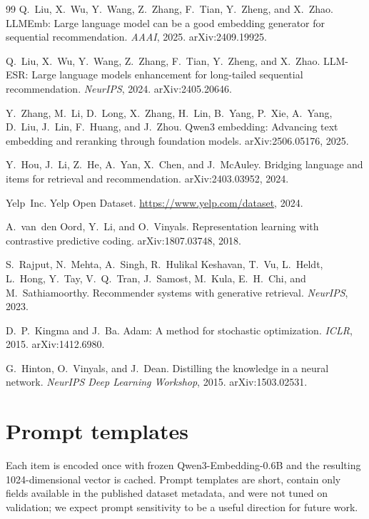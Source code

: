 \documentclass{article}
\begin{document}
{\begin{thebibliography}{99}
Q.~Liu, X.~Wu, Y.~Wang, Z.~Zhang, F.~Tian, Y.~Zheng, and X.~Zhao.
LLMEmb: Large language model can be a good embedding generator for
sequential recommendation.
\emph{AAAI}, 2025. arXiv:2409.19925.

Q.~Liu, X.~Wu, Y.~Wang, Z.~Zhang, F.~Tian, Y.~Zheng, and X.~Zhao.
LLM-ESR: Large language models enhancement for long-tailed sequential
recommendation.
\emph{NeurIPS}, 2024. arXiv:2405.20646.

Y.~Zhang, M.~Li, D.~Long, X.~Zhang, H.~Lin, B.~Yang, P.~Xie, A.~Yang,
D.~Liu, J.~Lin, F.~Huang, and J.~Zhou.
Qwen3 embedding: Advancing text embedding and reranking through
foundation models.
arXiv:2506.05176, 2025.

Y.~Hou, J.~Li, Z.~He, A.~Yan, X.~Chen, and J.~McAuley.
Bridging language and items for retrieval and recommendation.
arXiv:2403.03952, 2024.

Yelp~Inc.
Yelp Open Dataset.
\url{https://www.yelp.com/dataset}, 2024.

A.~van~den Oord, Y.~Li, and O.~Vinyals.
Representation learning with contrastive predictive coding.
arXiv:1807.03748, 2018.

S.~Rajput, N.~Mehta, A.~Singh, R.~Hulikal Keshavan, T.~Vu, L.~Heldt,
L.~Hong, Y.~Tay, V.~Q.~Tran, J.~Samost, M.~Kula, E.~H.~Chi, and
M.~Sathiamoorthy.
Recommender systems with generative retrieval.
\emph{NeurIPS}, 2023.

D.~P.~Kingma and J.~Ba.
Adam: A method for stochastic optimization.
\emph{ICLR}, 2015. arXiv:1412.6980.

G.~Hinton, O.~Vinyals, and J.~Dean.
Distilling the knowledge in a neural network.
\emph{NeurIPS Deep Learning Workshop}, 2015. arXiv:1503.02531.

\end{thebibliography}
}

\clearpage
\appendix
\section{Prompt templates}
\label{app:prompts}

Each item is encoded once with frozen Qwen3-Embedding-0.6B and the
resulting 1024-dimensional vector is cached. Prompt templates are
short, contain only fields available in the published dataset
metadata, and were not tuned on validation; we expect prompt
sensitivity to be a useful direction for future work.
\end{document}
